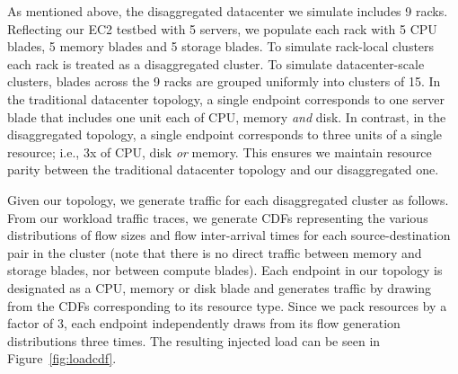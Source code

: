 As mentioned above, the disaggregated datacenter we simulate includes %
9 racks. Reflecting our EC2 testbed with 5 servers, we populate each rack with  5 CPU blades, 5 memory blades and 5 storage blades.
To simulate rack-local clusters each rack is treated as a disaggregated cluster. 
To simulate datacenter-scale clusters, blades across the 9 racks are grouped uniformly into clusters of 15.
In the traditional datacenter topology, a single endpoint corresponds to one server blade that includes one unit each of CPU, memory \emph{and} disk. In contrast, in the disaggregated topology, a single endpoint corresponds to three units of a single resource; i.e., 3x of CPU, disk \emph{or} memory. This ensures we maintain resource parity between the traditional datacenter topology and our disaggregated one.





Given our topology, we generate traffic for each disaggregated cluster as follows. From our workload traffic traces, we generate CDFs representing the various distributions of flow sizes and flow inter-arrival times for each source-destination pair in the cluster (note that there is no direct traffic between memory and storage blades, nor between compute blades).
Each endpoint in our topology is designated as a CPU, memory or disk blade and 
generates traffic by drawing from the CDFs corresponding to its resource type.
Since we pack resources by a factor of 3, each endpoint independently draws from its flow generation distributions three times. 
The resulting injected load can be seen in Figure~\ref{fig:loadcdf}. 






